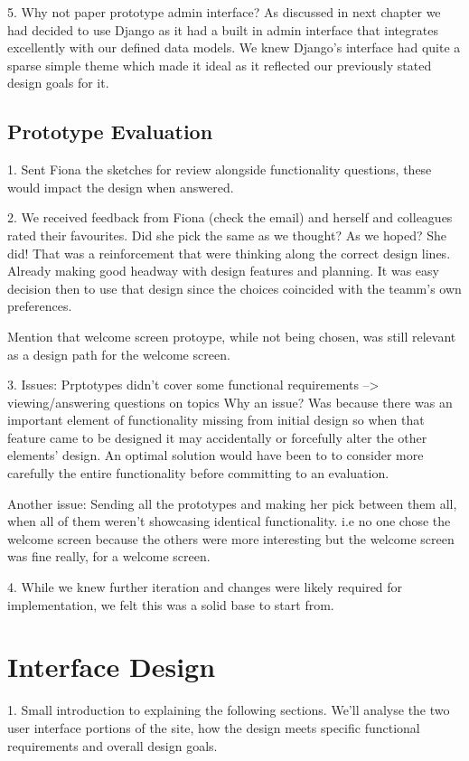 \documentclass{l3proj}
\begin{document}
5. Why not paper prototype admin interface?
   As discussed in next chapter we had decided to use Django as it had a built in admin interface that integrates excellently with our defined data models. We knew Django's interface had quite a sparse simple theme which made it ideal as it reflected our previously stated design goals for it.
  
\subsection{Prototype Evaluation}

1. Sent Fiona the sketches for review alongside functionality questions, these would impact the design when answered.
 
2. We received feedback from Fiona (check the email) and herself and colleagues rated their favourites. Did she pick the same  
   as we thought? As we hoped? She did! That was a reinforcement that were thinking along the correct design lines. Already    making good headway with design features and planning. It was easy decision then to use that design since the choices coincided with the teamm's own preferences.
   
Mention that welcome screen protoype, while not being chosen, was still relevant as a design path for the welcome screen.

3. Issues: Prptotypes didn't cover some functional requirements --> viewing/answering questions on topics
   Why an issue? Was because there was an important element of functionality missing from initial design so when that feature came to be designed it may accidentally or forcefully alter the other elements' design. An optimal solution would have been to to consider more carefully the entire functionality before committing to an evaluation. 
   
   Another issue: Sending all the prototypes and making her pick between them all, when all of them weren't showcasing identical functionality. i.e no one chose the welcome screen because the others were more interesting but the welcome screen was fine really, for a welcome screen.  
   
4. While we knew further iteration and changes were likely required for implementation, we felt this was a solid base to start from.

\section{Interface Design}
1. Small introduction to explaining the following sections.
We'll analyse the two user interface portions of the site, how the design meets specific functional requirements and overall design goals. 
\end{document}
